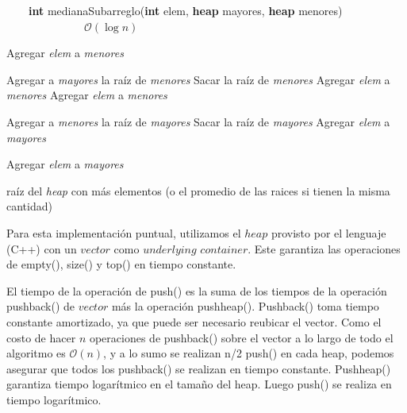 \documentclass[spanish,a4paper]{article}
\begin{document}
\begin{algorithm}
\caption{\ \ \ \ \textbf{int} medianaSubarreglo(\textbf{int} elem, \textbf{heap} mayores, \textbf{heap} menores)  \ \ \ \ \ \ \ \ \ \ \ \ \ \ $\mathcal{O}(\log{}n)$}
\label{alg2}        %
\begin{algorithmic}

        
        \STATE Agregar \textit{elem} a \textit{menores}
        
    \ELSE
        
                \STATE Agregar a \textit{mayores} la raíz de \textit{menores}
                \STATE Sacar la raíz de \textit{menores}
                \STATE Agregar \textit{elem} a \textit{menores}
            \ELSE
                \STATE Agregar \textit{elem} a \textit{menores}
            \ENDIF
            
        \ELSE
        
            
                \STATE Agregar a \textit{menores} la raíz de \textit{mayores}
                \STATE Sacar la raíz de \textit{mayores}
                \STATE Agregar \textit{elem} a \textit{mayores}
        
            \ELSE
        
                \STATE Agregar \textit{elem} a \textit{mayores}
            
            \ENDIF
        \ENDIF
    \ENDIF
    
    \RETURN raíz del \textit{heap} con más elementos (o el promedio de las raices si tienen la misma cantidad)

\end{algorithmic}
\end{algorithm}


Para esta implementación puntual, utilizamos el $heap$ provisto por el lenguaje (C++) con un $vector$ como $underlying$ $container$. Este garantiza las operaciones de empty(), size() y top() en tiempo constante.

El tiempo de la operación de push() es la suma de los tiempos de la operación push\textunderscore back() de $vector$ más la operación push\textunderscore heap(). Push\textunderscore back() toma tiempo constante amortizado, ya que puede ser necesario reubicar el vector. Como el costo de hacer $n$ operaciones de push\textunderscore back() sobre el vector a lo largo de todo el algoritmo es $\mathcal{O}(n)$, y a lo sumo se realizan n/2 push() en cada heap, podemos asegurar que todos los push\textunderscore back() se realizan en tiempo constante. Push\textunderscore heap() garantiza tiempo logarítmico en el tamaño del heap. Luego push() se realiza en tiempo logarítmico.
\end{document}
